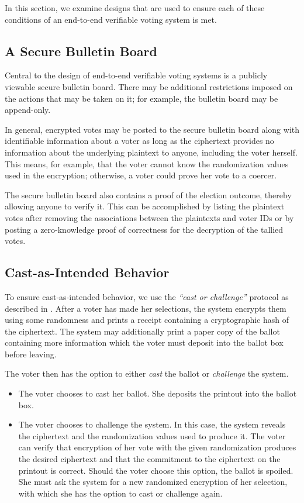 In this section, we examine designs that are used to ensure each of these conditions of an end-to-end verifiable voting system is met.

\subsection{A Secure Bulletin Board} \label{evote:design:sbb}

Central to the design of end-to-end verifiable voting systems is a publicly viewable secure bulletin board. There may be additional restrictions imposed on the actions that may be taken on it; for example, the bulletin board may be append-only.

In general, encrypted votes may be posted to the secure bulletin board along with identifiable information about a voter as long as the ciphertext provides no information about the underlying plaintext to anyone, including the voter herself. This means, for example, that the voter cannot know the randomization values used in the encryption; otherwise, a voter could prove her vote to a coercer.

The secure bulletin board also contains a proof of the election outcome, thereby allowing anyone to verify it. This can be accomplished by listing the plaintext votes after removing the associations between the plaintexts and voter IDs or by posting a zero-knowledge proof of correctness for the decryption of the tallied votes.

\subsection{Cast-as-Intended Behavior} \label{evote:design:castasintended}

To ensure cast-as-intended behavior, we use the \emph{``cast or challenge''} protocol as described in \cite{neff04, benaloh06}. After a voter has made her selections, the system encrypts them using some randomness and prints a receipt containing a cryptographic hash of the ciphertext. The system may additionally print a paper copy of the ballot containing more information which the voter must deposit into the ballot box before leaving.

The voter then has the option to either \emph{cast} the ballot or \emph{challenge} the system.
\begin{itemize}
\item The voter chooses to cast her ballot. She deposits the printout into the ballot box.
\item The voter chooses to challenge the system. In this case, the system reveals the ciphertext and the randomization values used to produce it. The voter can verify that encryption of her vote with the given randomization produces the desired ciphertext and that the commitment to the ciphertext on the printout is correct. Should the voter choose this option, the ballot is spoiled. She must ask the system for a new randomized encryption of her selection, with which she has the option to cast or challenge again.
\end{itemize}


